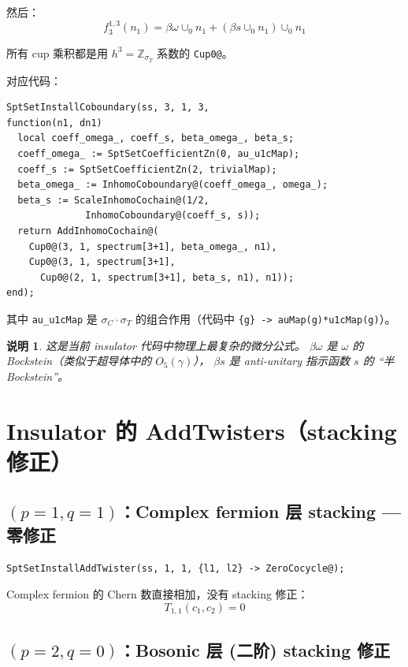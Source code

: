 \documentclass[a4paper,fontset=ubuntu,12pt]{ctexart}
\newtheorem{remark}[definition]{说明}
\newcommand{\ZZ}{\mathbb{Z}}
\newcommand{\aT}{\sigma_T}
\newcommand{\aC}{\sigma_C}
\begin{document}
然后：
\begin{equation}
\label{eq:d3-13}
\boxed{f_3^{1,3}(n_1) = \beta\omega \cup_0 n_1 + (\beta s \cup_0 n_1) \cup_0 n_1}
\end{equation}

所有 cup 乘积都是用 $h^3 = \ZZ_{\aT}$ 系数的 \texttt{Cup0@}。

对应代码：
\begin{lstlisting}
SptSetInstallCoboundary(ss, 3, 1, 3,
function(n1, dn1)
  local coeff_omega_, coeff_s, beta_omega_, beta_s;
  coeff_omega_ := SptSetCoefficientZn(0, au_u1cMap);
  coeff_s := SptSetCoefficientZn(2, trivialMap);
  beta_omega_ := InhomoCoboundary@(coeff_omega_, omega_);
  beta_s := ScaleInhomoCochain@(1/2,
              InhomoCoboundary@(coeff_s, s));
  return AddInhomoCochain@(
    Cup0@(3, 1, spectrum[3+1], beta_omega_, n1),
    Cup0@(3, 1, spectrum[3+1],
      Cup0@(2, 1, spectrum[3+1], beta_s, n1), n1));
end);
\end{lstlisting}

其中 \texttt{au\_u1cMap} 是 $\aC \cdot \aT$ 的组合作用（代码中 \texttt{\{g\} -> auMap(g)*u1cMap(g)}）。

\begin{remark}
这是当前 insulator 代码中物理上最复杂的微分公式。
$\beta\omega$ 是 $\omega$ 的 Bockstein（类似于超导体中的 $O_5(\gamma)$），
$\beta s$ 是 anti-unitary 指示函数 $s$ 的 ``半 Bockstein''。
\end{remark}

\section{Insulator 的 AddTwisters（stacking 修正）}
\label{sec:twisters}

\subsection{$(p = 1, q = 1)$：Complex fermion 层 stacking — 零修正}

\begin{lstlisting}
SptSetInstallAddTwister(ss, 1, 1, {l1, l2} -> ZeroCocycle@);
\end{lstlisting}

Complex fermion 的 Chern 数直接相加，没有 stacking 修正：
\begin{equation}
T_{1,1}(c_1, c_2) = 0
\end{equation}

\subsection{$(p = 2, q = 0)$：Bosonic 层 (二阶) stacking 修正}
\end{document}
